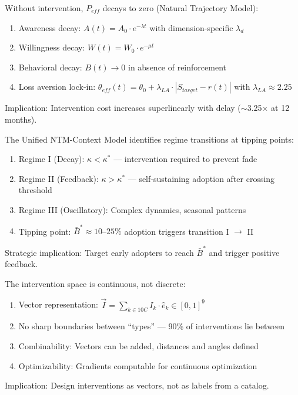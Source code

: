 \begin{theorem}
Without intervention, $P_{eff}$ decays to zero (Natural Trajectory Model):
\begin{enumerate}
\item Awareness decay: $A(t) = A_0 \cdot e^{-\lambda t}$ with dimension-specific $\lambda_d$
\item Willingness decay: $W(t) = W_0 \cdot e^{-\mu t}$
\item Behavioral decay: $B(t) \to 0$ in absence of reinforcement
\item Loss aversion lock-in: $\theta_{eff}(t) = \theta_0 + \lambda_{LA} \cdot |S_{target} - r(t)|$ with $\lambda_{LA} \approx 2.25$
\end{enumerate}
Implication: Intervention cost increases superlinearly with delay ($\sim$3.25$\times$ at 12 months).
\end{theorem}

\begin{theorem}
The Unified NTM-Context Model identifies regime transitions at tipping points:
\begin{enumerate}
\item Regime I (Decay): $\kappa < \kappa^*$ --- intervention required to prevent fade
\item Regime II (Feedback): $\kappa > \kappa^*$ --- self-sustaining adoption after crossing threshold
\item Regime III (Oscillatory): Complex dynamics, seasonal patterns
\item Tipping point: $\bar{B}^* \approx 10$--$25\%$ adoption triggers transition I $\to$ II
\end{enumerate}
Strategic implication: Target early adopters to reach $\bar{B}^*$ and trigger positive feedback.
\end{theorem}

\begin{theorem}
The intervention space is continuous, not discrete:
\begin{enumerate}
\item Vector representation: $\vec{I} = \sum_{k \in 10C} I_k \cdot \hat{e}_k \in [0,1]^9$
\item No sharp boundaries between ``types'' --- 90\% of interventions lie between
\item Combinability: Vectors can be added, distances and angles defined
\item Optimizability: Gradients computable for continuous optimization
\end{enumerate}
Implication: Design interventions as vectors, not as labels from a catalog.
\end{theorem}

